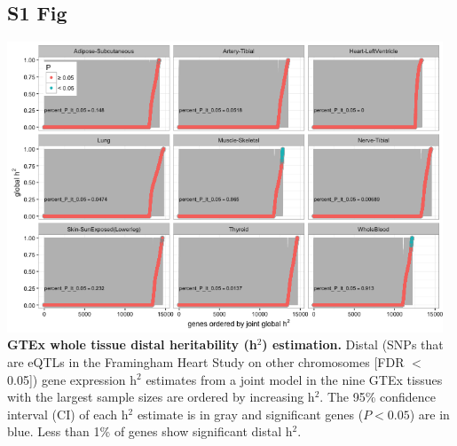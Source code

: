 \documentclass[10pt,letterpaper]{article}
\begin{document}
\begin{singlespace}

\subsection*{S1 Fig}
\includegraphics[width=13cm]{Figures/GenArch_Supp/S1Fig.png}
\label{S1_Fig}
{\bf GTEx whole tissue distal heritability (h$^2$) estimation.} Distal (SNPs that are eQTLs in the Framingham Heart Study on other chromosomes [FDR $<$ 0.05]) gene expression h$^2$ estimates from a joint model in the nine GTEx tissues with the largest sample sizes are ordered by increasing h$^2$. The 95\% confidence interval (CI) of each h$^2$ estimate is in gray and significant genes ($P<0.05$) are in blue. Less than 1\% of genes show significant distal h$^2$.


\end{singlespace}
\end{document}
